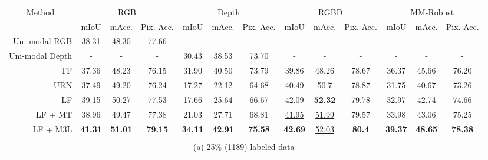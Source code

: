 \documentclass[10pt,twocolumn,letterpaper]{article}
\begin{document}
\begin{table*}[h]
{\begin{tabular}{rccc|ccc|ccc|ccc}
\toprule
\multicolumn{1}{c}{\multirow{2}{*}{Method}} & \multicolumn{3}{c|}{RGB} & \multicolumn{3}{c|}{Depth} & \multicolumn{3}{c|}{RGBD} & \multicolumn{3}{c}{MM-Robust} \\
\multicolumn{1}{c}{} & mIoU & mAcc. & Pix. Acc. & mIoU & mAcc. & Pix. Acc. & mIoU & mAcc. & Pix. Acc. & mIoU & mAcc. & Pix. Acc. \\ \midrule
Uni-modal RGB & 38.31 & 48.30 & 77.66 & - & - & - & - & - & - & - & - & - \\
Uni-modal Depth & - & - & - & 30.43 & 38.53 & 73.70 & - & - & - & - & - & - \\
TF \cite{tokenfusion}& 37.36 & 48.23 & 76.15 & 31.90 & 40.50 & 73.79 & 39.86 & 48.26 & 78.67 & 36.37 & 45.66 & 76.20 \\
URN \cite{urn}& 37.49 & 49.20 & 76.24 & 17.27 & 22.12 & 64.68 & 40.49 & 50.7 & 78.87 & 31.75 & 40.67 & 73.26 \\
LF & 39.15 & 50.27 & 77.53 & 17.66 & 25.64 & 66.67 & \underline{42.09} & \textbf{52.32} & 79.78 & 32.97 & 42.74 & 74.66 \\ \midrule
LF + MT & 38.96 & 49.47 & 77.38 & 21.03 & 27.71 & 68.81 & \underline{41.95} & \underline{51.99} & 79.57 & 33.98 & 43.06 & 75.25 \\
LF + M3L & \textbf{41.31} & \textbf{51.01} & \textbf{79.15} & \textbf{34.11} & \textbf{42.91} & \textbf{75.58} & \textbf{42.69} & \underline{52.03} & \textbf{80.4} & \textbf{39.37} & \textbf{48.65} & \textbf{78.38} \\ \bottomrule


\multicolumn{13}{c}{\vspace{0.1cm}}\\
\multicolumn{13}{c}{(a) 25\% (1189) labeled data}\\


\end{tabular}}
\end{table*}
\end{document}
